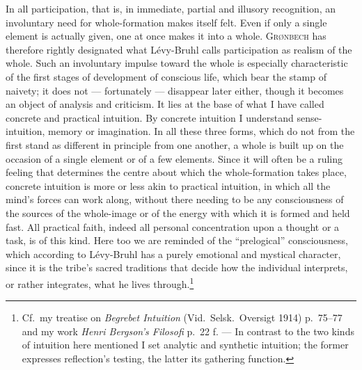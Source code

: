 \documentclass[12pt]{book}
\newcommand{\opage}[1]{\marginnote{\footnotesize\textit{[#1]}}}
\begin{document}
In all participation, that is, in immediate, partial and illusory recognition,
an involuntary need for whole-formation makes itself felt. Even if only a single
element is actually given, one at once makes it into a whole. \textsc{Grønbech}
has therefore rightly designated what Lévy-Bruhl calls participation as realism
of the whole. Such an involuntary impulse toward the whole is especially
characteristic of the first stages of development of conscious life, which bear
the stamp of naivety; it does not --- fortunately --- disappear later either,
though it becomes an object of analysis and criticism. It lies at the base of
what I have called concrete and practical intuition. By concrete intuition I
understand sense-intuition, memory or imagination. In all these three forms,
which do not from the first stand as different in principle from one another, a
whole is built up on the occasion of a single element or of a few elements.
Since it will often be a ruling feeling that determines the centre about which
the whole-formation takes place, concrete intuition is more or less akin to
practical intuition, in which all the mind's forces can work along, without
there needing to be any consciousness of the sources of the whole-image or of
the energy with which it is formed and held fast. All practical faith, \opage{23}indeed
all personal concentration upon a thought or a task, is of this kind. Here too
we are reminded of the ``prelogical'' consciousness, which according to
Lévy-Bruhl has a purely emotional and mystical character, since it is the
tribe's sacred traditions that decide how the individual interprets, or rather
integrates, what he lives through.\footnote{Cf.\ my treatise on \textit{Begrebet
Intuition} (Vid.\ Selsk.\ Oversigt 1914) p.\ 75--77 and my work \textit{Henri
Bergson's Filosofi} p.\ 22 f. --- In contrast to the two kinds of intuition here
mentioned I set analytic and synthetic intuition; the former expresses
reflection's testing, the latter its gathering function.}
\end{document}
